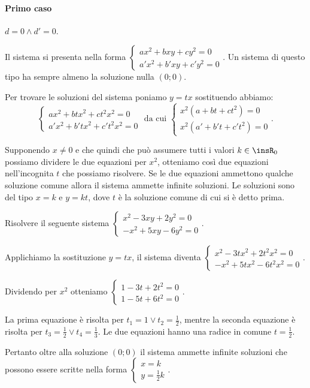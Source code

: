 \paragraph{Primo caso} $d=0 \wedge d'=0$.

Il sistema si presenta nella forma $\left\{\begin{array}{l}{{ax}^2+{bxy}+{cy}^2=0}\\{a'x^2+b'{xy}+c'y^2=0}\end{array}\right.$. Un sistema di questo tipo ha sempre almeno la soluzione nulla $ (0; 0) $.

Per trovare le soluzioni del sistema poniamo $y={tx}$ sostituendo abbiamo: \[ \left\{\begin{array}{l}{{ax}^2+{btx}^2+{ct}^2x^2=0}\\{a'x^2+b'{tx}^2+c't^2x^2=0}\end{array}\right. \text{ da cui } \left\{\begin{array}{l}{x^2(a+{bt}+{ct}^2)=0}\\{x^2(a'+b't+c't^2)=0}\end{array}\right.. \]

Supponendo $x\neq 0$ e che quindi che può assumere tutti i valori $k\in \insR_0$ possiamo dividere le due equazioni per $x^2$, otteniamo così due equazioni nell'incognita $t$ che possiamo risolvere. Se le due equazioni ammettono qualche soluzione comune allora il sistema ammette infinite soluzioni. Le soluzioni sono del tipo $x=k$ e $y={kt}$, dove $t$ è la soluzione comune di cui si è detto prima.

\begin{exrig}
\begin{esempio}
Risolvere il seguente sistema $\left\{\begin{array}{l}x^2-3{xy}+2y^2=0 \\-x^2+5{xy}-6y^2=0 \end{array}\right.$.

Applichiamo la sostituzione $y={tx}$, il sistema diventa $\left\{\begin{array}{l}x^2-3{tx}^2+2t^2x^2=0 \\-x^2+5{tx}^2-6t^2x^2=0 \end{array}\right.$.

Dividendo per $x^2$ otteniamo $\left\{\begin{array}{l}1-3t+2t^2=0 \\1-5t+6t^2=0 \end{array}\right.$.

La prima equazione è risolta per $t_1=1\vee t_2=\frac 1 2$, mentre la seconda equazione è risolta per $t_3=\frac 1 2\vee t_4=\frac 1 3$. Le due equazioni hanno una radice in comune $t=\frac 1 2$.

Pertanto oltre alla soluzione $(0;0)$ il sistema ammette infinite soluzioni che possono essere scritte nella forma $\left\{\begin{array}{l}x=k \\y=\frac 1 2k \end{array}\right.$.
\end{esempio}
\end{exrig}

